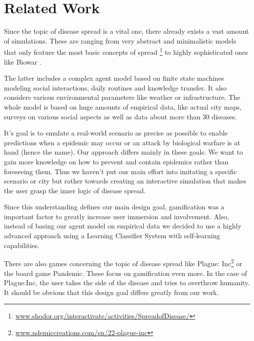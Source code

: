 \documentclass[table]{sig-alternate-05-2015}
\begin{document}
\section{Related Work}

Since the topic of disease spread is a vital one, there already exists a vast amount of simulations. These are ranging from very abstract and minimalistic models that only feature the most basic concepts of spread \footnote{\url{www.shodor.org/interactivate/activities/SpreadofDisease/}} to highly sophisticated ones like Biowar \cite{biowar}.

The latter includes a complex agent model based on finite state machines modeling social interactions, daily routines and knowledge transfer. It also considers various environmental parameters like weather or infrastructure. The whole model is based on huge amounts of empirical data, like actual city maps, surveys on various social aspects as well as data about more than 30 diseases.

It's goal is to emulate a real-world scenario as precise as possible to enable predictions when a epidemic may occur or an attack by biological warfare is at hand (hence the name). Our approach differs mainly in these goals: We want to gain more knowledge on how to prevent and contain epidemics rather than foreseeing them. Thus we haven't put our main effort into imitating a specific scenario or city but rather towards creating an interactive simulation that makes the user grasp the inner logic of disease spread.

Since this understanding defines our main design goal, gamification was a important factor to greatly increase user immersion and involvement. Also, instead of basing our agent model on empirical data we decided to use a highly advanced approach using a Learning Classifier System with self-learning capabilities.

There are also games concerning the topic of disease spread like Plague: Inc\footnote{\url{www.ndemiccreations.com/en/22-plague-inc}} or the board game Pandemic. These focus on gamification even more. In the case of Plague:Inc, the user takes the side of the disease and tries to overthrow humanity. It should be obvious that this design goal differs greatly from our work.

\clearpage

\end{document}

